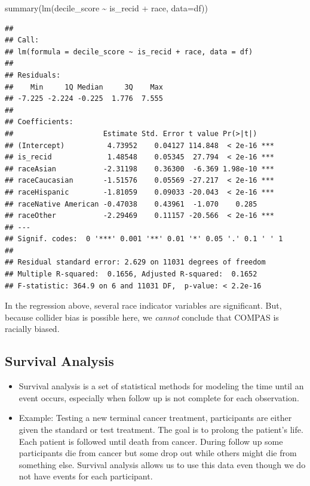 \documentclass[
]{article}
\newenvironment{Shaded}{\begin{snugshade}}{\end{snugshade}}
\newcommand{\AttributeTok}[1]{\textcolor[rgb]{0.77,0.63,0.00}{#1}}
\newcommand{\FunctionTok}[1]{\textcolor[rgb]{0.00,0.00,0.00}{#1}}
\newcommand{\NormalTok}[1]{#1}
\newcommand{\SpecialCharTok}[1]{\textcolor[rgb]{0.00,0.00,0.00}{#1}}
\begin{document}
\begin{Shaded}
\begin{Highlighting}[]
\FunctionTok{summary}\NormalTok{(}\FunctionTok{lm}\NormalTok{(decile\_score }\SpecialCharTok{\textasciitilde{}}\NormalTok{ is\_recid }\SpecialCharTok{+}\NormalTok{ race, }\AttributeTok{data=}\NormalTok{df))}
\end{Highlighting}
\end{Shaded}

\begin{verbatim}
## 
## Call:
## lm(formula = decile_score ~ is_recid + race, data = df)
## 
## Residuals:
##    Min     1Q Median     3Q    Max 
## -7.225 -2.224 -0.225  1.776  7.555 
## 
## Coefficients:
##                     Estimate Std. Error t value Pr(>|t|)    
## (Intercept)          4.73952    0.04127 114.848  < 2e-16 ***
## is_recid             1.48548    0.05345  27.794  < 2e-16 ***
## raceAsian           -2.31198    0.36300  -6.369 1.98e-10 ***
## raceCaucasian       -1.51576    0.05569 -27.217  < 2e-16 ***
## raceHispanic        -1.81059    0.09033 -20.043  < 2e-16 ***
## raceNative American -0.47038    0.43961  -1.070    0.285    
## raceOther           -2.29469    0.11157 -20.566  < 2e-16 ***
## ---
## Signif. codes:  0 '***' 0.001 '**' 0.01 '*' 0.05 '.' 0.1 ' ' 1
## 
## Residual standard error: 2.629 on 11031 degrees of freedom
## Multiple R-squared:  0.1656, Adjusted R-squared:  0.1652 
## F-statistic: 364.9 on 6 and 11031 DF,  p-value: < 2.2e-16
\end{verbatim}

In the regression above, several race indicator variables are
significant. But, because collider bias is possible here, we
\emph{cannot} conclude that COMPAS is racially biased.

\hypertarget{survival-analysis}{%
\subsection{Survival Analysis}\label{survival-analysis}}

\begin{itemize}
\item
  Survival analysis is a set of statistical methods for modeling the
  time until an event occurs, especially when follow up is not complete
  for each observation.
\item
  Example: Testing a new terminal cancer treatment, participants are
  either given the standard or test treatment. The goal is to prolong
  the patient's life. Each patient is followed until death from cancer.
  During follow up some participants die from cancer but some drop out
  while others might die from something else. Survival analysis allows
  us to use this data even though we do not have events for each
  participant.
\end{itemize}
\end{document}
